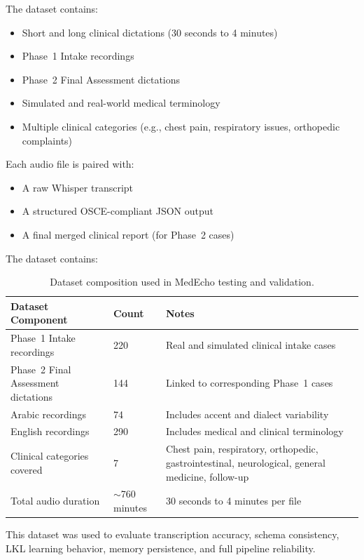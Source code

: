 The dataset contains:
\begin{itemize}
    \item Short and long clinical dictations (30 seconds to 4 minutes)
    \item Phase~1 Intake recordings
    \item Phase~2 Final Assessment dictations
    \item Simulated and real-world medical terminology
    \item Multiple clinical categories (e.g., chest pain, respiratory issues, orthopedic complaints)
\end{itemize}

Each audio file is paired with:
\begin{itemize}
    \item A raw Whisper transcript
    \item A structured OSCE-compliant JSON output
    \item A final merged clinical report (for Phase~2 cases)
\end{itemize}
The dataset contains:
\begin{table}[H]
\centering
\renewcommand{\arraystretch}{1.3}
\begin{tabular}{|p{4.5cm}|p{2.5cm}|p{6cm}|}
\hline
\textbf{Dataset Component} & \textbf{Count} & \textbf{Notes} \\
\hline
Phase~1 Intake recordings & 220 & Real and simulated clinical intake cases \\
\hline
Phase~2 Final Assessment dictations & 144 & Linked to corresponding Phase~1 cases \\
\hline
Arabic recordings & 74 & Includes accent and dialect variability \\
\hline
English recordings & 290 & Includes medical and clinical terminology \\
\hline
Clinical categories covered & 7 & Chest pain, respiratory, orthopedic, gastrointestinal, neurological, general medicine, follow-up \\
\hline
Total audio duration & $\sim$760 minutes & 30 seconds to 4 minutes per file \\
\hline
\end{tabular}
\caption{Dataset composition used in MedEcho testing and validation.}
\label{tab:dataset-composition}
\end{table}



This dataset was used to evaluate transcription accuracy, schema consistency, LKL learning
behavior, memory persistence, and full pipeline reliability.



